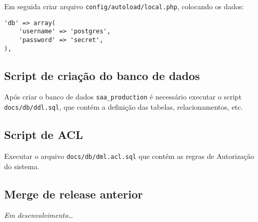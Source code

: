 Em seguida criar arquivo \texttt{config/autoload/local.php}, colocando
os dados:

\begin{verbatim}
'db' => array(
    'username' => 'postgres',
    'password' => 'secret',
),
\end{verbatim}

\subsection{Script de criação do banco de
dados}\label{script-de-criauxe7uxe3o-do-banco-de-dados}

Após criar o banco de dados \texttt{saa\_production} é necessário
executar o script \texttt{docs/db/ddl.sql}, que contém a definição das
tabelas, relacionamentos, etc.

\subsection{Script de ACL}\label{script-de-acl}

Executar o arquivo \texttt{docs/db/dml.acl.sql} que contém as regras de
Autorização do sistema.

\subsection{Merge de release anterior}\label{merge-de-release-anterior}

\emph{Em desenvolvimento\ldots{}}
